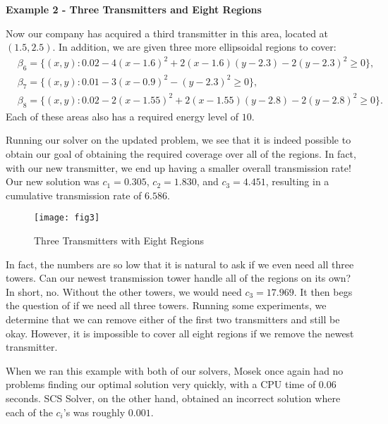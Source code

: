 	\textbf{Example 2 - Three Transmitters and Eight Regions}
	
	Now our company has acquired a third transmitter in this area, located at $(1.5, 2.5)$. In addition, we are given three more ellipsoidal regions to cover:
	$$
	\begin{aligned}
	&\beta_6 = \{(x,y) : 0.02-4(x-1.6)^2+2(x-1.6)(y-2.3)-2(y-2.3)^2 \geq 0\},\\
	&\beta_7 = \{(x,y) : 0.01-3(x-0.9)^2-(y-2.3)^2 \geq 0\},\\
	&\beta_8 = \{(x,y) :0.02-2(x-1.55)^2+2(x-1.55)(y-2.8)-2(y-2.8)^2 \geq 0\}.
	\end{aligned}
	$$
	Each of these areas also has a required energy level of $10$. 
	
	Running our solver on the updated problem, we see that it is indeed possible to obtain our goal of obtaining the required coverage over all of the regions. In fact, with our new transmitter, we end up having a smaller overall transmission rate! Our new solution was $c_1 = 0.305$, $c_2 = 1.830$, and $c_3 = 4.451$, resulting in a cumulative transmission rate of $6.586$.
	
	\begin{figure}[h]
		\centering
		\texttt{[image: fig3]}
		\caption{Three Transmitters with Eight Regions}
	\end{figure}
	
	In fact, the numbers are so low that it is natural to ask if we even need all three towers. Can our newest transmission tower handle all of the regions on its own? In short, no. Without the other towers, we would need $c_3 = 17.969$. It then begs the question of if we need all three towers. Running some experiments, we determine that we can remove either of the first two transmitters and still be okay. However, it is impossible to cover all eight regions if we remove the newest transmitter.
	
	When we ran this example with both of our solvers, Mosek once again had no problems finding our optimal solution very quickly, with a CPU time of 0.06 seconds. SCS Solver, on the other hand, obtained an incorrect solution where each of the $c_i$'s was roughly $0.001$. 